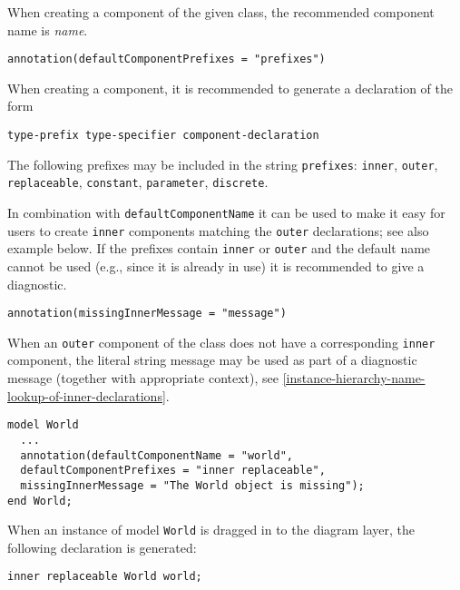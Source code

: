 When creating a component of the given class, the recommended component name is \emph{name}.

\begin{lstlisting}[language=modelica]
annotation(defaultComponentPrefixes = "prefixes")
\end{lstlisting}

When creating a component, it is recommended to generate a declaration of the form
\begin{lstlisting}[language=grammar]
type-prefix type-specifier component-declaration
\end{lstlisting}

The following prefixes may be included in the string \lstinline!prefixes!: \lstinline!inner!,
\lstinline!outer!, \lstinline!replaceable!, \lstinline!constant!, \lstinline!parameter!, \lstinline!discrete!.

\begin{nonnormative}
In combination with \lstinline!defaultComponentName! it can be used to make it easy for users to create \lstinline!inner! components
matching the \lstinline!outer! declarations; see also example below.  If the prefixes contain \lstinline!inner! or \lstinline!outer!
and the default name cannot be used (e.g., since it is already in use) it is recommended to give a diagnostic.
\end{nonnormative}

\begin{lstlisting}[language=modelica]
annotation(missingInnerMessage = "message")
\end{lstlisting}

When an \lstinline!outer! component of the class does not have a corresponding \lstinline!inner!
component, the literal string message may be used as part of a diagnostic message (together with appropriate context), see
\cref{instance-hierarchy-name-lookup-of-inner-declarations}.

\begin{example}
\begin{lstlisting}[language=modelica]
model World
  ...
  annotation(defaultComponentName = "world",
  defaultComponentPrefixes = "inner replaceable",
  missingInnerMessage = "The World object is missing");
end World;
\end{lstlisting}
When an instance of model \lstinline!World! is dragged in to the diagram layer, the
following declaration is generated:
\begin{lstlisting}[language=modelica]
inner replaceable World world;
\end{lstlisting}
\end{example}

